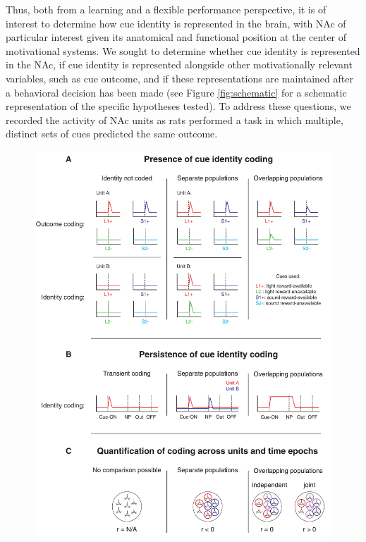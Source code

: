 \documentclass[11pt]{article}
\begin{document}
Thus, both from a learning and a flexible performance perspective, it
is of interest to determine how cue identity is represented in the
brain, with NAc of particular interest given its anatomical and
functional position at the center of motivational systems. We sought
to determine whether cue identity is represented in the NAc, if cue
identity is represented alongside other motivationally relevant
variables, such as cue outcome, and if these representations are
maintained after a behavioral decision has been made (see Figure
\ref{fig:schematic} for a schematic representation of the specific hypotheses tested). To address these questions, we recorded the
activity of NAc units as rats performed a task in which multiple,
distinct sets of cues predicted the same outcome.


 \begin{figure}[ht!]
\centering
\includegraphics[height=0.68\textheight]{Fig 1 - Schematic neural.pdf}

\end{figure}
\end{document}
